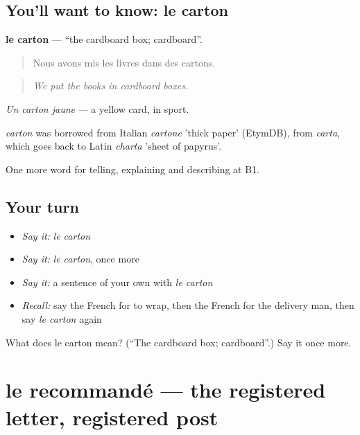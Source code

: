 \subsection*{You'll want to know: le carton}
\textbf{le carton} — \textquotedblleft{}the cardboard box; cardboard\textquotedblright{}.

\begin{quote}
Nous avons mis les livres dans des cartons.
\end{quote}

\begin{quote}
\emph{We put the books in cardboard boxes.}
\end{quote}

\emph{Un carton jaune} — a yellow card, in sport.

\begin{cousinweb}
\emph{carton} was borrowed from Italian \emph{cartone} 'thick paper' (EtymDB), from \emph{carta}, which goes back to Latin \emph{charta} 'sheet of papyrus'.
\end{cousinweb}

\begin{grammarlens}[title={What you've built}]
One more word for telling, explaining and describing at B1.
\end{grammarlens}

\subsection*{Your turn}
\begin{itemize}
\raggedright
  \item \emph{Say it:} \emph{le carton}
  \item \emph{Say it:} \emph{le carton}, once more
  \item \emph{Say it:} a sentence of your own with \emph{le carton}
  \item \emph{Recall:} say the French for to wrap, then the French for the delivery man, then say \emph{le carton} again
\end{itemize}

\begin{tcolorbox}[breakable,colback=teal!4,colframe=teal!35!black,title={Before you move on}]
What does le carton mean? (\textquotedblleft{}The cardboard box; cardboard\textquotedblright{}.) Say it once more.
\end{tcolorbox}
\section[le recommandé]{le recommandé — the registered letter, registered post}

